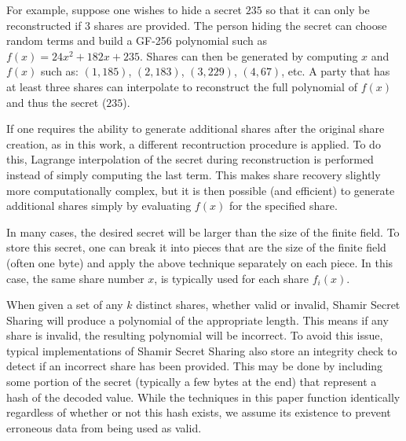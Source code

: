 For example, suppose one wishes to hide a secret $235$ so that it can only be
reconstructed if $3$ shares are provided.   The person hiding the secret can 
choose random terms and build a GF-256 polynomial such as $f(x) = 24x^2 + 
182x + 235$.   Shares can then be generated by computing $x$ and $f(x)$ such
as: $(1,185)$, $(2, 183)$, $(3, 229)$, $(4,67)$, etc.   A party that has at 
least three shares can interpolate to reconstruct the full polynomial of
$f(x)$ and thus the secret ($235$).

If one requires the ability to generate additional shares
after the original share creation, as in this work, a different recontruction
procedure is applied.   To do this, Lagrange interpolation of the secret during 
reconstruction is performed instead of simply computing the last term.   This 
makes share recovery slightly more computationally
complex, but it is then possible (and efficient) to generate additional shares
simply by evaluating $f(x)$ for the specified share.

In many cases, the desired secret will be larger than the size of the finite
field.   To store this secret, one can break it into pieces that are the size
of the finite field (often one byte) and apply the above technique separately 
on each piece.  In this case, the same share number $x$, is typically used for 
each share $f_i(x)$.

When given a set of any $k$ distinct shares, whether valid or invalid, Shamir
Secret Sharing will produce a polynomial of the appropriate length.
This means if any share is invalid, the resulting polynomial will be 
incorrect.   To avoid this issue, 
typical implementations of Shamir Secret Sharing also store an integrity check
to detect if an incorrect share has been provided.   This may be
done by including some portion of the secret (typically a few bytes at the 
end) that represent a hash of the decoded value.  While the techniques
in this paper function identically regardless of whether or not this
hash exists, we assume its existence to prevent erroneous data from
being used as valid.   




